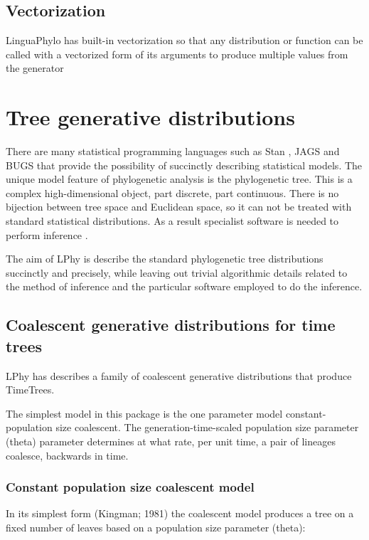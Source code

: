 \documentclass[oneside]{article}
\begin{document}
\subsection{Vectorization}

LinguaPhylo has built-in vectorization so that any distribution or function can be called with a vectorized form of its arguments to produce multiple values from the generator

\section{Tree generative distributions}

There are many statistical programming languages such as Stan
\cite{carpenter2017stan}, JAGS \cite{plummer2003jags} and BUGS \cite{lunn2009bugs, gilks1994language} that provide the possibility
of succinctly describing statistical models. The unique model feature of
phylogenetic analysis is the phylogenetic tree.
This is a complex high-dimensional object, part discrete, part
continuous.
There is no bijection between tree space and Euclidean space, so it
can not be treated with standard statistical distributions.
As a result specialist software is needed to perform inference \cite{hohna2016revbayes,bouckaert2019beastanalysis}.

The aim of LPhy is describe the standard phylogenetic tree
distributions succinctly and precisely, while leaving out trivial algorithmic details related to the method
of inference and the particular software employed to do the inference.

\subsection{Coalescent generative distributions for time trees}

LPhy has describes a family of coalescent generative distributions
that produce TimeTrees.

The simplest model in this package is the one parameter model
constant-population size coalescent.
The generation-time-scaled population size parameter (theta) parameter determines at
what rate, per unit time, a pair of lineages coalesce, backwards in time.

\subsubsection{Constant population size coalescent model}

In its simplest form (Kingman; 1981) the coalescent model produces a
tree on a fixed number of leaves based on a population size parameter (theta):
\end{document}
